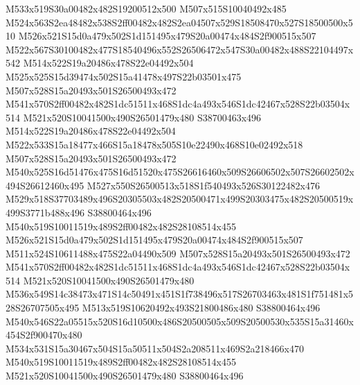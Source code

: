 \documentclass{article}
\begin{document}
\begin{multicols}{2}
M533x519S30a00482x482S19200512x500 M507x515S10040492x485 M524x563S2ea48482x538S2ff00482x482S2ea04507x529S18508470x527S18500500x510 M526x521S15d0a479x502S1d151495x479S20a00474x484S2f900515x507 M522x567S30100482x477S18540496x552S26506472x547S30a00482x488S22104497x542 M514x522S19a20486x478S22e04492x504 M525x525S15d39474x502S15a41478x497S22b03501x475 M507x528S15a20493x501S26500493x472 M541x570S2ff00482x482S1dc51511x468S1dc4a493x546S1dc42467x528S22b03504x514 M521x520S10041500x490S26501479x480 S38700463x496 M514x522S19a20486x478S22e04492x504 M522x533S15a18477x466S15a18478x505S10e22490x468S10e02492x518 M507x528S15a20493x501S26500493x472 M540x525S16d51476x475S16d51520x475S26616460x509S26606502x507S26602502x494S26612460x495 M527x550S26500513x518S1f540493x526S30122482x476 M529x518S37703489x496S20305503x482S20500471x499S20303475x482S20500519x499S3771b488x496 S38800464x496 M540x519S10011519x489S2ff00482x482S28108514x455 M526x521S15d0a479x502S1d151495x479S20a00474x484S2f900515x507 M511x524S10611488x475S22a04490x509 M507x528S15a20493x501S26500493x472 M541x570S2ff00482x482S1dc51511x468S1dc4a493x546S1dc42467x528S22b03504x514 M521x520S10041500x490S26501479x480 M536x549S14c38473x471S14c50491x451S1f738496x517S26703463x481S1f751481x528S26707505x495 M513x519S10620492x493S21800486x480 S38800464x496 M540x546S22a05515x520S16d10500x486S20500505x509S20500530x535S15a31460x454S2f900470x480 M534x531S15a30467x504S15a50511x504S2a208511x469S2a218466x470 M540x519S10011519x489S2ff00482x482S28108514x455 M521x520S10041500x490S26501479x480 S38800464x496








\end{multicols}
\end{document}

